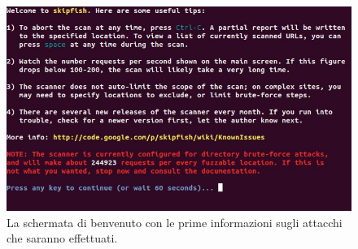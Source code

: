 \documentclass{article}
\begin{document}
\begin{itemize}
\begin{figure}[h!]
\centering
\includegraphics[width=\textwidth]{img/skipfish_welcome}
\caption{La schermata di benvenuto con le prime informazioni sugli attacchi che saranno effettuati.}
\end{figure}


\end{itemize}
\end{document}
